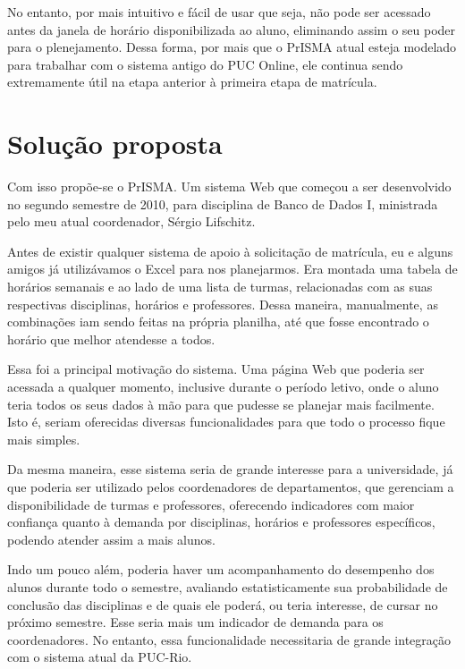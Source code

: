 \documentclass[graduacao,brazil]{ThesisPUC}
\begin{document}
No entanto, por mais intuitivo e fácil de usar que seja, não pode ser acessado antes da janela de horário disponibilizada ao aluno, eliminando assim o seu poder para o plenejamento. Dessa forma, por mais que o PrISMA atual esteja modelado para trabalhar com o sistema antigo do PUC Online, ele continua sendo extremamente útil na etapa anterior à primeira etapa de matrícula.



\chapter{Solução proposta}

Com isso propõe-se o PrISMA. Um sistema Web que começou a ser desenvolvido no segundo semestre de 2010, para disciplina de Banco de Dados I, ministrada pelo meu atual coordenador, Sérgio Lifschitz.

Antes de existir qualquer sistema de apoio à solicitação de matrícula, eu e alguns amigos já utilizávamos o Excel para nos planejarmos. Era montada uma tabela de horários semanais e ao lado de uma lista de turmas, relacionadas com as suas respectivas disciplinas, horários e professores. Dessa maneira, manualmente, as combinações iam sendo feitas na própria planilha, até que fosse encontrado o horário que melhor atendesse a todos.

Essa foi a principal motivação do sistema. Uma página Web que poderia ser acessada a qualquer momento, inclusive durante o período letivo, onde o aluno teria todos os seus dados à mão para que pudesse se planejar mais facilmente. Isto é, seriam oferecidas diversas funcionalidades para que todo o processo fique mais simples.

Da mesma maneira, esse sistema seria de grande interesse para a universidade, já que poderia ser utilizado pelos coordenadores de departamentos, que gerenciam a disponibilidade de turmas e professores, oferecendo indicadores com maior confiança quanto à demanda por disciplinas, horários e professores específicos, podendo atender assim a mais alunos.

Indo um pouco além, poderia haver um acompanhamento do desempenho dos alunos durante todo o semestre, avaliando estatisticamente sua probabilidade de conclusão das disciplinas e de quais ele poderá, ou teria interesse, de cursar no próximo semestre. Esse seria mais um indicador de demanda para os coordenadores. No entanto, essa funcionalidade necessitaria de grande integração com o sistema atual da PUC-Rio.
\end{document}
